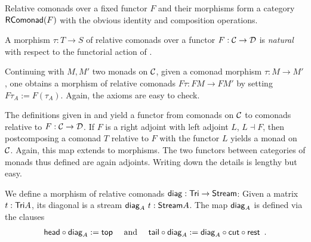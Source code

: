 \documentclass[envcountsame]{llncs}
\begin{document}
Relative comonads over a fixed functor $F$ and their morphisms form a category $\mathsf{RComonad}(F)$ with the obvious identity and composition operations.

\begin{remark}
A morphism $\tau : T\to S$ of relative comonads over a functor $F:{\mathcal{C}}\to\mathcal{D}$ is  \emph{natural}
with respect to the functorial action of .
\end{remark}

\begin{Long}

\begin{example}\label{ex_relcom_from_com_morphism}
 Continuing  with $M, M'$ two monads on ${\mathcal{C}}$, given a comonad morphism $\tau : M \to M'$, one obtains a morphism of 
 relative comonads $F\tau : FM\to FM'$ by setting $F\tau_A := F(\tau_A)$.
 Again, the axioms are easy to check.
\end{example}


\begin{remark}
 The definitions given in  and  yield a functor from 
 comonads on ${\mathcal{C}}$ to comonads relative to $F:{\mathcal{C}}\to\mathcal{D}$. 
 If $F$ is a right adjoint with left adjoint $L$, $L\dashv F$, then postcomposing a comonad $T$ relative to $F$ with the functor $L$
 yields a monad on ${\mathcal{C}}$. Again, this map extends to morphisms.
 The two functors between categories of monads thus defined are again adjoints.
 Writing down the details is lengthy but easy.
\end{remark}

\end{Long}


\begin{example}\label{ex_diag}
We define a morphism of relative comonads $\mathsf{diag} : \mathsf{Tri} \to \mathsf{Stream}$:
Given a matrix $t : \mathsf{Tri} A$, its diagonal is a stream $\mathsf{diag}_A~t : \mathsf{Stream} A$.
The map $\mathsf{diag}_A$ is defined via the clauses
\begin{align*} \comp{\diagonal_A}{\shead} := \head \quad\text{ and } \quad %
                  \comp{\diagonal_A}{\stail} := \comp{\comp{\tail}{\cut}}{\diagonal_A} \enspace . %
    \end{align*}
\end{example}

\end{document}
